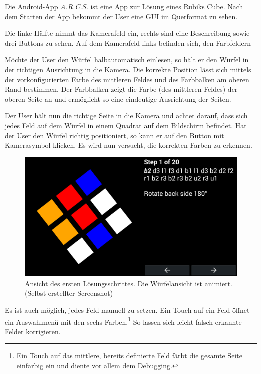 Die Android-App \emph{A.R.C.S.} ist eine App zur Lösung eines Rubiks Cube.
Nach dem Starten der App bekommt der User eine GUI im Querformat zu sehen.

Die linke Hälfte nimmt das Kamerafeld ein, rechts sind eine Beschreibung sowie
drei Buttons zu sehen. Auf dem Kamerafeld links befinden sich, den Farbfeldern

Möchte der User den Würfel halbautomatisch einlesen, so hält er den Würfel in
der richtigen Ausrichtung in die Kamera. Die korrekte Position lässt sich
mittels der vorkonfigurierten Farbe des mittleren Feldes und des Farbbalken am
oberen Rand bestimmen. Der Farbbalken zeigt die Farbe (des mittleren
Feldes) der oberen Seite an und ermöglicht so eine eindeutige Ausrichtung der
Seiten.

Der User hält nun die richtige Seite in die Kamera und achtet darauf, dass sich
jedes Feld auf dem Würfel in einem Quadrat auf dem Bildschirm befindet. Hat der
User den Würfel richtig positioniert, so kann er auf den Button mit Kamerasymbol
klicken. Es wird nun versucht, die korrekten Farben zu erkennen. 

\begin{figure}[ht!]
  \centering
  \includegraphics[width=\textwidth]{pics/arcs_solving.png}
  \caption{Ansicht des ersten Lösungsschrittes. Die Würfelansicht ist animiert.
  (Selbst erstellter Screenshot)}
  \label{fig:arcs_solving}
\end{figure}

Es ist auch möglich, jedes Feld manuell zu setzen. Ein Touch auf ein Feld öffnet
ein Auswahlmenü mit den sechs Farben.\footnote{Ein Touch auf das mittlere, bereits
definierte Feld färbt die gesamte Seite einfarbig ein und diente vor allem dem
Debugging.} So lassen sich leicht falsch erkannte Felder korrigieren.

